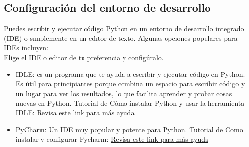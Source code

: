 \subsection{Configuración del entorno de desarrollo}
Puedes escribir y ejecutar código Python en un entorno de desarrollo integrado (IDE) o simplemente en un editor de texto. Algunas opciones populares para IDEs incluyen:\\

Elige el IDE o editor de tu preferencia y configúralo.
\begin{itemize}
    \item IDLE: es un programa que te ayuda a escribir y ejecutar código en Python. Es útil para principiantes porque combina un espacio para escribir código y un lugar para ver los resultados, lo que facilita aprender y probar cosas nuevas en Python. Tutorial de Cómo instalar Python y usar la herramienta IDLE: 
    \href{https://www.youtube.com/watch?v=F9eM_VoKGJQ}{Revisa este link para más ayuda}
    \begin{figure}[h]
        \centering
      \end{figure}
\newpage
    \item PyCharm: Un IDE muy popular y potente para Python. Tutorial de Como instalar y configurar Pycharm:
    \href{https://www.youtube.com/watch?v=wxdafAAzIWo }{Revisa este link para más ayuda}
    \begin{figure}[h]
        \centering
      \end{figure}


\end{itemize}
